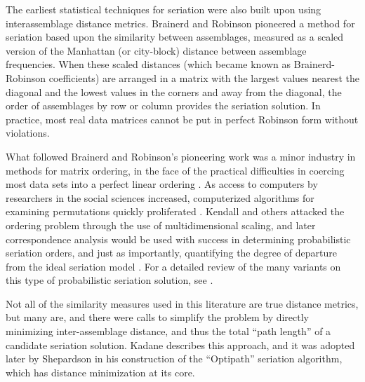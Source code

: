 \documentclass[graybox,natbib]{svmult}
\begin{document}
The earliest statistical techniques for seriation were also built upon
using interassemblage distance metrics. Brainerd and Robinson
\citep{Brainerd1951, Robinson1951} pioneered a method for seriation
based upon the similarity between assemblages, measured as a scaled
version of the Manhattan (or city-block) distance between assemblage
frequencies. When these scaled distances (which became known as
Brainerd-Robinson coefficients) are arranged in a matrix with the
largest values nearest the diagonal and the lowest values in the corners
and away from the diagonal, the order of assemblages by row or column
provides the seriation solution. In practice, most real data matrices
cannot be put in perfect Robinson form without violations.

What followed Brainerd and Robinson's pioneering work was a minor
industry in methods for matrix ordering, in the face of the practical
difficulties in coercing most data sets into a perfect linear ordering
\citep[e.g.,][]{dempsey1963statistical, Kendall1963, Matthews1963, Bordaz1970aa, Gardin1970, Kendall1970, Kendall1971}.
As access to computers by researchers in the social sciences increased,
computerized algorithms for examining permutations quickly proliferated
\citep{Ascher1963, craytor1968refinements, Kuzara1966}. Kendall
\citeyearpar{Kendall1969} and others attacked the ordering problem
through the use of multidimensional scaling, and later correspondence
analysis would be used with success in determining probabilistic
seriation orders, and just as importantly, quantifying the degree of
departure from the ideal seriation model \citep{Smith2005}. For a
detailed review of the many variants on this type of probabilistic
seriation solution, see \citep{Marquardt:1978aa}.

Not all of the similarity measures used in this literature are true
distance metrics, but many are, and there were calls to simplify the
problem by directly minimizing inter-assemblage distance, and thus the
total ``path length'' of a candidate seriation solution. Kadane
\citeyearpar{Kadane1971} describes this approach, and it was adopted
later by Shepardson \citeyearpar{shepardson2006} in his construction of
the ``Optipath'' seriation algorithm, which has distance minimization at
its core.
\end{document}
